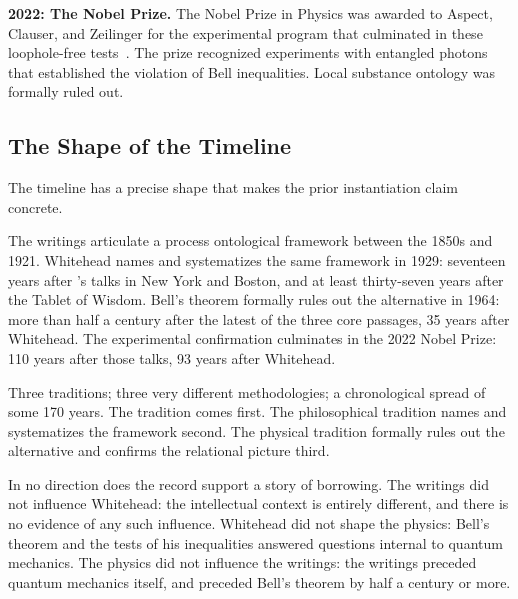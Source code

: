 \textbf{2022: The Nobel Prize.}
The Nobel Prize in Physics was awarded to Aspect, Clauser, and Zeilinger for the
experimental program that culminated in these loophole-free
tests~\citep{Zeilinger2023Nobel}.
The prize recognized experiments with entangled photons that established the
violation of Bell inequalities.
Local substance ontology was formally ruled out.

\subsection*{The Shape of the Timeline}

The timeline has a precise shape that makes the prior instantiation claim concrete.

The \bahai writings articulate a process ontological framework between the 1850s
and 1921.
Whitehead names and systematizes the same framework in 1929: seventeen years
after \AbdulBaha's talks in New York and Boston, and at least thirty-seven years
after the Tablet of Wisdom.
Bell's theorem formally rules out the alternative in 1964: more than half a
century after the latest of the three core passages, 35 years after Whitehead.
The experimental confirmation culminates in the 2022 Nobel Prize: 110 years
after those talks, 93 years after Whitehead.

Three traditions; three very different methodologies; a chronological spread
of some 170 years.
The \bahai tradition comes first.
The philosophical tradition names and systematizes the framework second.
The physical tradition formally rules out the alternative and confirms the
relational picture third.

In no direction does the record support a story of borrowing.
The \bahai writings did not influence Whitehead: the intellectual context is
entirely different, and there is no evidence of any such influence.
Whitehead did not shape the physics: Bell's theorem and the tests of his
inequalities answered questions internal to quantum mechanics.
The physics did not influence the \bahai writings: the writings preceded quantum
mechanics itself, and preceded Bell's theorem by half a century or more.

